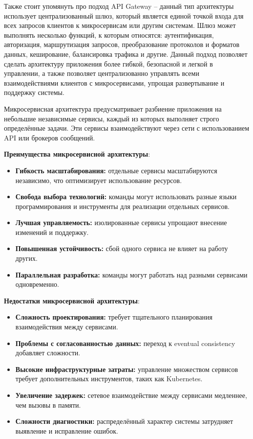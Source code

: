 Также стоит упомянуть про подход API Gateway – данный тип архитектуры использует централизованный шлюз, который является единой точкой входа для всех запросов клиентов к микросервисам или другим системам. Шлюз может выполнять несколько функций, к которым относятся: аутентификация, авторизация, маршрутизация запросов, преобразование протоколов и форматов данных, кеширование, балансировка трафика и другие. Данный подход позволяет сделать архитектуру приложения более гибкой, безопасной и легкой в управлении, а также позволяет централизованно управлять всеми взаимодействиями клиентов с микросервисами, упрощая развертывание и поддержку системы.

Микросервисная архитектура предусматривает разбиение приложения на небольшие независимые сервисы, каждый из которых выполняет строго определённые задачи. Эти сервисы взаимодействуют через сети с использованием API или брокеров сообщений.

\textbf{Преимущества микросервисной архитектуры}:
\begin{itemize}
    \item \textbf{Гибкость масштабирования:} отдельные сервисы масштабируются независимо, что оптимизирует использование ресурсов.
    \item \textbf{Свобода выбора технологий:} команды могут использовать разные языки программирования и инструменты для реализации отдельных сервисов.
    \item \textbf{Лучшая управляемость:} изолированные сервисы упрощают внесение изменений и поддержку.
    \item \textbf{Повышенная устойчивость:} сбой одного сервиса не влияет на работу других\cite{richards2015patterns}.
    \item \textbf{Параллельная разработка:} команды могут работать над разными сервисами одновременно.
\end{itemize}

\textbf{Недостатки микросервисной архитектуры}:
\begin{itemize}
    \item \textbf{Сложность проектирования:} требует тщательного планирования взаимодействия между сервисами.
    \item \textbf{Проблемы с согласованностью данных:} переход к eventual consistency добавляет сложности.
    \item \textbf{Высокие инфраструктурные затраты:} управление множеством сервисов требует дополнительных инструментов, таких как Kubernetes.
    \item \textbf{Увеличение задержек:} сетевое взаимодействие между сервисами медленнее, чем вызовы в памяти.
    \item \textbf{Сложности диагностики:} распределённый характер системы затрудняет выявление и исправление ошибок.
\end{itemize}

